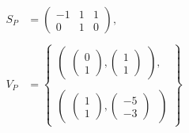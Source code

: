 \begin{align*}
    S_P &= \begin{pmatrix}
        -1 & 1 & 1 \\
        0 & 1 & 0
    \end{pmatrix}, \ \\ \\
    V_P &= \begin{Bmatrix}
        \begin{pmatrix}
              \begin{pmatrix}
                    0 \\
                    1
               \end{pmatrix},
               \begin{pmatrix}
                     1 \\
                     1
               \end{pmatrix}
        \end{pmatrix}, \\ \\
        \begin{pmatrix}
               \begin{pmatrix}
                    1 \\
                    1
               \end{pmatrix},
               \begin{pmatrix}
                    -5 \\
                    -3
              \end{pmatrix}
        \ \end{pmatrix}
    \end{Bmatrix}
\end{align*}
